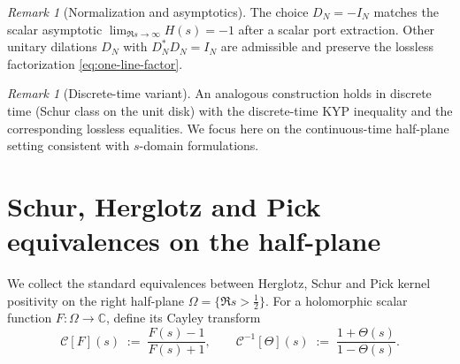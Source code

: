 \documentclass[11pt]{article}
\theoremstyle{definition}
\theoremstyle{remark}
\newtheorem{remark}[theorem]{Remark}
\newcommand{\C}{\mathbb{C}}
\begin{document}
\begin{remark}[Normalization and asymptotics]
The choice \(D_N=-I_N\) matches the scalar asymptotic \(\lim_{\Re s\to\infty} H(s)=-1\) after a scalar port extraction. Other unitary dilations \(D_N\) with \(D_N^*D_N=I_N\) are admissible and preserve the lossless factorization \eqref{eq:one-line-factor}.
\end{remark}

\begin{remark}[Discrete-time variant]
An analogous construction holds in discrete time (Schur class on the unit disk) with the discrete-time KYP inequality and the corresponding lossless equalities. We focus here on the continuous-time half-plane setting consistent with \(s\)-domain formulations.
\end{remark}

\section{Schur, Herglotz and Pick equivalences on the half-plane}\label{sec:equivalences}
We collect the standard equivalences between Herglotz, Schur and Pick kernel positivity on the right half-plane \(\Omega=\{\Re s>\tfrac12\}\). For a holomorphic scalar function \(F:\Omega\to\C\), define its Cayley transform
\[
 \mathcal C[F](s)\;:=\;\frac{F(s)-1}{F(s)+1},\qquad \mathcal C^{-1}[\Theta](s)\;:=\;\frac{1+\Theta(s)}{1-\Theta(s)}.
\]
\end{document}
